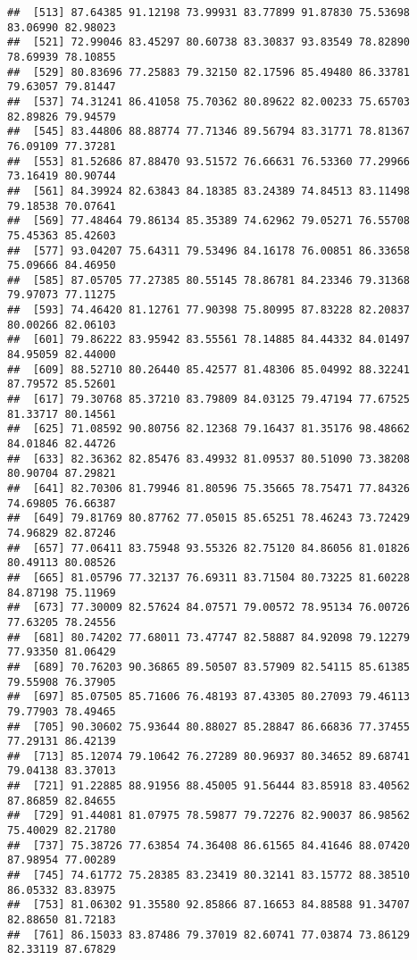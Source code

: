 \documentclass[
]{article}
\begin{document}
\begin{verbatim}
##  [513] 87.64385 91.12198 73.99931 83.77899 91.87830 75.53698 83.06990 82.98023
##  [521] 72.99046 83.45297 80.60738 83.30837 93.83549 78.82890 78.69939 78.10855
##  [529] 80.83696 77.25883 79.32150 82.17596 85.49480 86.33781 79.63057 79.81447
##  [537] 74.31241 86.41058 75.70362 80.89622 82.00233 75.65703 82.89826 79.94579
##  [545] 83.44806 88.88774 77.71346 89.56794 83.31771 78.81367 76.09109 77.37281
##  [553] 81.52686 87.88470 93.51572 76.66631 76.53360 77.29966 73.16419 80.90744
##  [561] 84.39924 82.63843 84.18385 83.24389 74.84513 83.11498 79.18538 70.07641
##  [569] 77.48464 79.86134 85.35389 74.62962 79.05271 76.55708 75.45363 85.42603
##  [577] 93.04207 75.64311 79.53496 84.16178 76.00851 86.33658 75.09666 84.46950
##  [585] 87.05705 77.27385 80.55145 78.86781 84.23346 79.31368 79.97073 77.11275
##  [593] 74.46420 81.12761 77.90398 75.80995 87.83228 82.20837 80.00266 82.06103
##  [601] 79.86222 83.95942 83.55561 78.14885 84.44332 84.01497 84.95059 82.44000
##  [609] 88.52710 80.26440 85.42577 81.48306 85.04992 88.32241 87.79572 85.52601
##  [617] 79.30768 85.37210 83.79809 84.03125 79.47194 77.67525 81.33717 80.14561
##  [625] 71.08592 90.80756 82.12368 79.16437 81.35176 98.48662 84.01846 82.44726
##  [633] 82.36362 82.85476 83.49932 81.09537 80.51090 73.38208 80.90704 87.29821
##  [641] 82.70306 81.79946 81.80596 75.35665 78.75471 77.84326 74.69805 76.66387
##  [649] 79.81769 80.87762 77.05015 85.65251 78.46243 73.72429 74.96829 82.87246
##  [657] 77.06411 83.75948 93.55326 82.75120 84.86056 81.01826 80.49113 80.08526
##  [665] 81.05796 77.32137 76.69311 83.71504 80.73225 81.60228 84.87198 75.11969
##  [673] 77.30009 82.57624 84.07571 79.00572 78.95134 76.00726 77.63205 78.24556
##  [681] 80.74202 77.68011 73.47747 82.58887 84.92098 79.12279 77.93350 81.06429
##  [689] 70.76203 90.36865 89.50507 83.57909 82.54115 85.61385 79.55908 76.37905
##  [697] 85.07505 85.71606 76.48193 87.43305 80.27093 79.46113 79.77903 78.49465
##  [705] 90.30602 75.93644 80.88027 85.28847 86.66836 77.37455 77.29131 86.42139
##  [713] 85.12074 79.10642 76.27289 80.96937 80.34652 89.68741 79.04138 83.37013
##  [721] 91.22885 88.91956 88.45005 91.56444 83.85918 83.40562 87.86859 82.84655
##  [729] 91.44081 81.07975 78.59877 79.72276 82.90037 86.98562 75.40029 82.21780
##  [737] 75.38726 77.63854 74.36408 86.61565 84.41646 88.07420 87.98954 77.00289
##  [745] 74.61772 75.28385 83.23419 80.32141 83.15772 88.38510 86.05332 83.83975
##  [753] 81.06302 91.35580 92.85866 87.16653 84.88588 91.34707 82.88650 81.72183
##  [761] 86.15033 83.87486 79.37019 82.60741 77.03874 73.86129 82.33119 87.67829

\end{verbatim}
\end{document}
